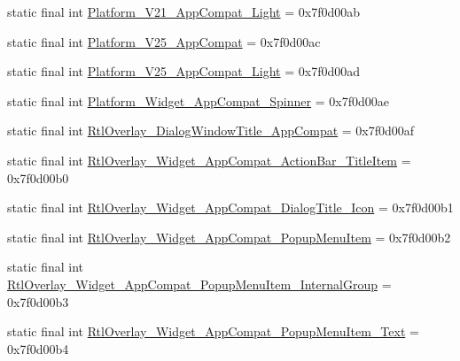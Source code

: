 \begin{DoxyCompactItemize}
\item 
static final int \mbox{\hyperlink{classandroid_1_1support_1_1v7_1_1appcompat_1_1_r_1_1style_a272dadfad222068ee05d9945e4697c3f}{Platform\+\_\+\+V21\+\_\+\+App\+Compat\+\_\+\+Light}} = 0x7f0d00ab
\item 
static final int \mbox{\hyperlink{classandroid_1_1support_1_1v7_1_1appcompat_1_1_r_1_1style_a6349d5fc2b57d178192a7037760c9b8e}{Platform\+\_\+\+V25\+\_\+\+App\+Compat}} = 0x7f0d00ac
\item 
static final int \mbox{\hyperlink{classandroid_1_1support_1_1v7_1_1appcompat_1_1_r_1_1style_a347dfbadb2696828a7d6bc7e3212114c}{Platform\+\_\+\+V25\+\_\+\+App\+Compat\+\_\+\+Light}} = 0x7f0d00ad
\item 
static final int \mbox{\hyperlink{classandroid_1_1support_1_1v7_1_1appcompat_1_1_r_1_1style_a90ab46cdb3f297b8f5078a63d4c05b7f}{Platform\+\_\+\+Widget\+\_\+\+App\+Compat\+\_\+\+Spinner}} = 0x7f0d00ae
\item 
static final int \mbox{\hyperlink{classandroid_1_1support_1_1v7_1_1appcompat_1_1_r_1_1style_a9afb3efc2ad067987863fcb4c137113a}{Rtl\+Overlay\+\_\+\+Dialog\+Window\+Title\+\_\+\+App\+Compat}} = 0x7f0d00af
\item 
static final int \mbox{\hyperlink{classandroid_1_1support_1_1v7_1_1appcompat_1_1_r_1_1style_a8126b14ed95f0bc8e4bfb220e9da09bd}{Rtl\+Overlay\+\_\+\+Widget\+\_\+\+App\+Compat\+\_\+\+Action\+Bar\+\_\+\+Title\+Item}} = 0x7f0d00b0
\item 
static final int \mbox{\hyperlink{classandroid_1_1support_1_1v7_1_1appcompat_1_1_r_1_1style_a0e4154ec705b54236d1e38b0d65755f7}{Rtl\+Overlay\+\_\+\+Widget\+\_\+\+App\+Compat\+\_\+\+Dialog\+Title\+\_\+\+Icon}} = 0x7f0d00b1
\item 
static final int \mbox{\hyperlink{classandroid_1_1support_1_1v7_1_1appcompat_1_1_r_1_1style_ae1bae14f1eb7c8efb1126019df2b46c5}{Rtl\+Overlay\+\_\+\+Widget\+\_\+\+App\+Compat\+\_\+\+Popup\+Menu\+Item}} = 0x7f0d00b2
\item 
static final int \mbox{\hyperlink{classandroid_1_1support_1_1v7_1_1appcompat_1_1_r_1_1style_a8de9fa977b83ffcd83f9d6c0f210664d}{Rtl\+Overlay\+\_\+\+Widget\+\_\+\+App\+Compat\+\_\+\+Popup\+Menu\+Item\+\_\+\+Internal\+Group}} = 0x7f0d00b3
\item 
static final int \mbox{\hyperlink{classandroid_1_1support_1_1v7_1_1appcompat_1_1_r_1_1style_a27940d2a97fcebbe0e833376ce4c05fc}{Rtl\+Overlay\+\_\+\+Widget\+\_\+\+App\+Compat\+\_\+\+Popup\+Menu\+Item\+\_\+\+Text}} = 0x7f0d00b4
\item 

\end{DoxyCompactItemize}
